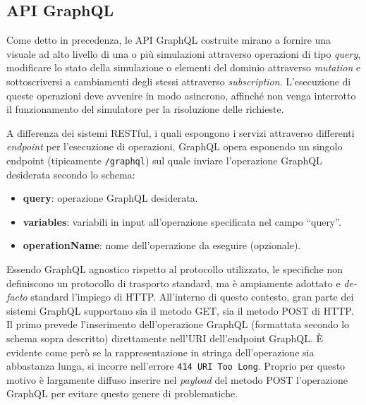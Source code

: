 \subsection{API GraphQL}\label{ssec:server-gql-apis}
Come detto in precedenza, le API GraphQL costruite mirano a fornire una visuale ad alto livello di una o più simulazioni attraverso operazioni di tipo \textit{query},
modificare lo stato della simulazione o elementi del dominio attraverso \textit{mutation} e sottoscriversi a cambiamenti degli stessi attraverso \textit{subscription}.
L'esecuzione di queste operazioni deve avvenire in modo asincrono, affinché non venga interrotto il funzionamento del simulatore per la risoluzione delle richieste.

A differenza dei sistemi \ac{REST}ful, i quali espongono i servizi attraverso differenti \textit{endpoint} per l'esecuzione di operazioni, GraphQL opera esponendo un
singolo endpoint (tipicamente \texttt{/graphql}) sul quale inviare l'operazione GraphQL desiderata secondo lo schema:
\begin{itemize}
    \item \textbf{query}: operazione GraphQL desiderata.
    \item \textbf{variables}: variabili in input all'operazione specificata nel campo ``query''.
    \item \textbf{operationName}: nome dell'operazione da eseguire (opzionale).
\end{itemize}
Essendo GraphQL agnostico rispetto al protocollo utilizzato, le specifiche non definiscono un protocollo di trasporto standard, ma è ampiamente adottato
e \textit{de-facto} standard l'impiego di HTTP.
All'interno di questo contesto, gran parte dei sistemi GraphQL supportano sia il metodo GET, sia il metodo POST di HTTP. Il primo prevede l'inserimento
dell'operazione GraphQL (formattata secondo lo schema sopra descritto) direttamente nell'URI dell'endpoint GraphQL. È evidente come però se la rappresentazione
in stringa dell'operazione sia abbastanza lunga, si incorre nell'errore \texttt{414 URI Too Long}. Proprio per questo motivo è largamente diffuso inserire
nel \textit{payload} del metodo POST l'operazione GraphQL per evitare questo genere di problematiche.

